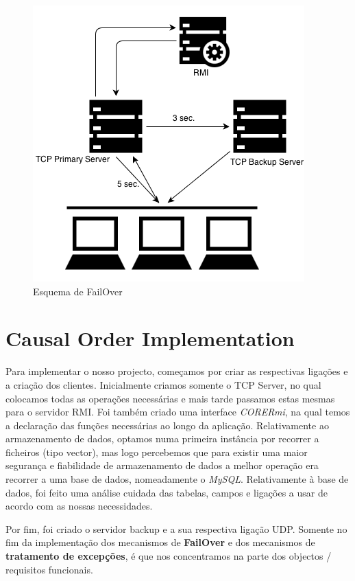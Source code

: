 \documentclass[12pt]{article} %
\begin{document}
\begin{figure}[!ht]
	\centering
		\includegraphics[scale=0.6]{failover.png}
	\caption{Esquema de FailOver}
	\label{fig:Pictures_failover}
\end{figure}

\pagebreak
\section{Causal Order Implementation}
\label{sec:causal}
Para implementar o nosso projecto, começamos por criar as respectivas ligações e a criação dos clientes. Inicialmente criamos somente o TCP Server, no qual colocamos todas as operações necessárias e mais tarde passamos estas mesmas para o servidor RMI. Foi também criado uma interface \emph{CORERmi}, na qual temos a declaração das funções necessárias ao longo da aplicação.
Relativamente ao armazenamento de dados, optamos numa primeira instância por recorrer a ficheiros (tipo vector), mas logo percebemos que para existir uma maior segurança e fiabilidade de armazenamento de dados a melhor operação era recorrer a uma base de dados, nomeadamente o \emph{MySQL}. Relativamente à base de dados, foi feito uma análise cuidada das tabelas, campos e ligações a usar de acordo com as nossas necessidades.

Por fim, foi criado o servidor backup e a sua respectiva ligação UDP. Somente no fim da implementação dos mecanismos de \textbf{FailOver} e dos mecanismos de \textbf{tratamento de excepções}, é que nos concentramos na parte dos objectos / requisitos funcionais.
\end{document}
